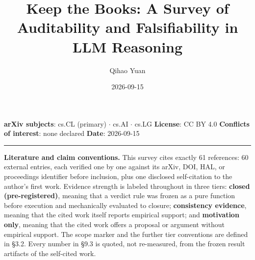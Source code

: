 \documentclass[11pt,a4paper]{article}
\title{Keep the Books: A Survey of Auditability and Falsifiability in LLM Reasoning}
\author{Qihao Yuan}
\date{2026-09-15}
\begin{document}
\maketitle
\thispagestyle{empty}
\vspace{0.5em}
\noindent\textbf{arXiv subjects}: cs.CL (primary) $\cdot$ cs.AI $\cdot$ cs.LG \quad \textbf{License}: CC BY 4.0 \quad \textbf{Conflicts of interest}: none declared \quad \textbf{Date}: 2026-09-15
\vspace{0.5em}
\hrule
\vspace{0.8em}

\noindent \textbf{Literature and claim conventions.} This survey cites exactly 61 references: 60 external entries, each verified one by one against its arXiv, DOI, HAL, or proceedings identifier before inclusion, plus one disclosed self-citation to the author's first work. Evidence strength is labeled throughout in three tiers: \textbf{closed (pre-registered)}, meaning that a verdict rule was frozen as a pure function before execution and mechanically evaluated to closure; \textbf{consistency evidence}, meaning that the cited work itself reports empirical support; and \textbf{motivation only}, meaning that the cited work offers a proposal or argument without empirical support. The scope marker and the further tier conventions are defined in §3.2. Every number in §9.3 is quoted, not re-measured, from the frozen result artifacts of the self-cited work.
\end{document}
